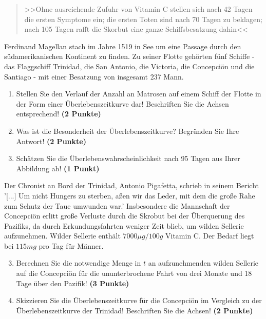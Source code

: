 \documentclass[a4paper, 9pt]{scrartcl}\usepackage[]{graphicx}\usepackage[]{xcolor}
\begin{document}
\begin{quote}
  >>Ohne ausreichende Zufuhr von Vitamin C stellen sich nach 42 Tagen die ersten Symptome ein; die ersten Toten sind nach 70 Tagen zu beklagen; nach 105 Tagen rafft die Skorbut eine ganze Schiffsbesatzung dahin<<
\end{quote}

Ferdinand Magellan stach im Jahre 1519 in See um eine Passage durch den südamerikanischen Kontinent zu finden. Zu seiner Flotte gehörten fünf Schiffe - das Flaggschiff Trinidad, die San Antonio, die Victoria, die Concepciön und die Santiago - mit einer Besatzung von insgesamt 237 Mann. 

\begin{enumerate}
\item Stellen Sie den Verlauf der Anzahl an Matrosen auf einem Schiff der Flotte in der Form einer Überlebenszeitkurve dar! Beschriften Sie die Achsen entsprechend! \textbf{(2 Punkte)} 
\item Was ist die Besonderheit der Überlebenszeitkurve? Begründen Sie Ihre Antwort! \textbf{(2 Punkte)} 
\item Schätzen Sie die Überlebenswahrscheinlichkeit nach 95 Tagen aus Ihrer Abbildung ab! \textbf{(1 Punkt)} 
\end{enumerate}

Der Chronist an Bord der Trinidad, Antonio Pigafetta, schrieb in seinem Bericht '[...] Um nicht Hungers zu sterben, aßen wir das Leder, mit dem die große Rahe zum Schutz der Taue umwunden war.' Insbesondere die Mannschaft der Concepciön erlitt große Verluste durch die Skrobut bei der Überquerung des Pazifiks, da durch Erkundungsfahrten weniger Zeit blieb, um wilden Sellerie aufzunehmen. Wilder Sellerie enthält $7000\mu g/100g$ Vitamin C. Der Bedarf liegt bei $115mg$ pro Tag für Männer.

\begin{enumerate}
  \setcounter{enumi}{2}
\item Berechnen Sie die notwendige Menge in $t$ an aufzunehmenden wilden Sellerie auf die Concepciön für die ununterbrochene Fahrt von drei Monate und 18 Tage über den Pazifik! \textbf{(3 Punkte)}
\item Skizzieren Sie die Überlebenszeitkurve für die Concepciön im Vergleich zu der Überlebenszeitkurve der Trinidad! Beschriften Sie die Achsen! \textbf{(2 Punkte)}
\end{enumerate}

 
\clearpage
\end{document}
